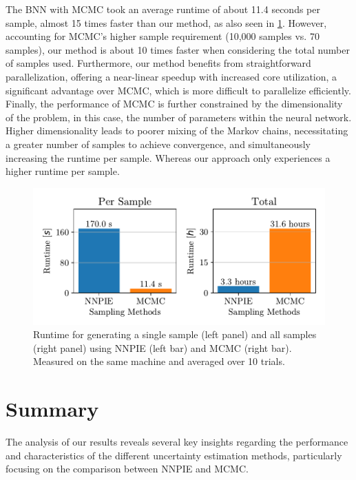 The BNN with MCMC took an average runtime of about 11.4 seconds per sample, almost 15 times faster than our method, as also seen in \cref{fig:runtime_comparison}. However, accounting for MCMC's higher sample requirement (10,000 samples vs. 70 samples), our method is about 10 times faster when considering the total number of samples used. Furthermore, our method benefits from straightforward parallelization, offering a near-linear speedup with increased core utilization, a significant advantage over MCMC, which is more difficult to parallelize efficiently.
Finally, the performance of MCMC is further constrained by the dimensionality of the problem, in this case, the number of parameters within the neural network. Higher dimensionality leads to poorer mixing of the Markov chains, necessitating a greater number of samples to achieve convergence, and simultaneously increasing the runtime per sample. Whereas our approach only experiences a higher runtime per sample.

\begin{figure}[h]
    \centering
    \includegraphics{figs/runtime_comparison.pdf}
    \caption{Runtime for generating a single sample (left panel) and all samples (right panel) using NNPIE (left bar) and MCMC (right bar). Measured on the same machine and averaged over 10 trials.}
    \label{fig:runtime_comparison}
\end{figure}



\section{Summary}
The analysis of our results reveals several key insights regarding the performance and characteristics of the different uncertainty estimation methods, particularly focusing on the comparison between NNPIE and MCMC.

